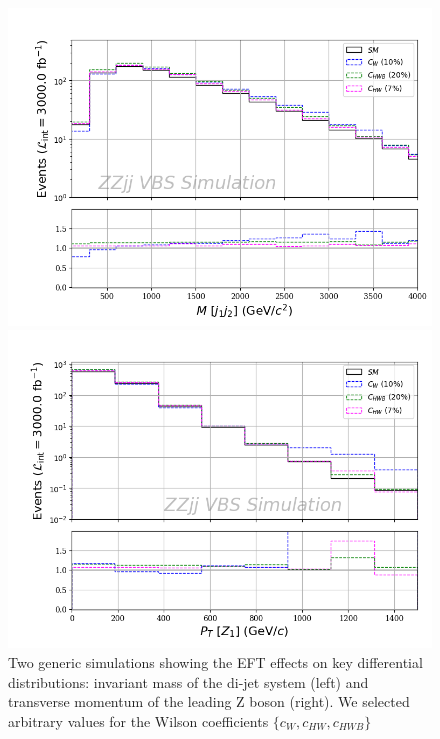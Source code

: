 \documentclass[../report.tex]{subfiles}
\begin{document}
% 
\begin{figure}[htbp]
  \begin{minipage}[b]{0.5\textwidth}
    \includegraphics[width=1.02\textwidth]{mjj.png}
  \end{minipage}
  \begin{minipage}[b]{0.5\textwidth}
    \includegraphics[width=1.02\textwidth]{ptz.png}
  \end{minipage}
  \caption{Two generic simulations showing the EFT effects on key differential distributions: invariant mass of the di-jet system (left) and transverse momentum of the leading Z boson (right). We selected arbitrary values for the Wilson coefficients $\lbrace c_W, c_{HW}, c_{HWB} \rbrace$}
  \label{fig:plots}
\end{figure}
\end{document}

